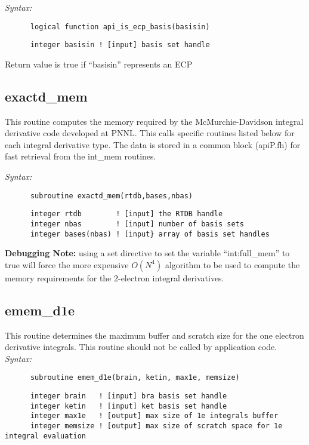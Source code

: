 {\it Syntax:} 
\begin{verbatim} 
      logical function api_is_ecp_basis(basisin) 
\end{verbatim} 
\begin{verbatim} 
      integer basisin ! [input] basis set handle 
\end{verbatim} 
Return value is true if ``basisin'' represents an ECP 
 
\subsection{exactd\_mem} 
This routine computes the memory required by the  
McMurchie-Davidson integral derivative code developed at PNNL. 
This calls specific routines listed below for each integral 
derivative type.  The data is stored in a common block (apiP.fh) 
for fast retrieval from the int\_mem routines. 
 
{\it Syntax:} 
\begin{verbatim} 
      subroutine exactd_mem(rtdb,bases,nbas) 
\end{verbatim} 
\begin{verbatim} 
      integer rtdb        ! [input] the RTDB handle 
      integer nbas        ! [input] number of basis sets 
      integer bases(nbas) ! [input} array of basis set handles 
\end{verbatim} 
 
{\bf Debugging Note:} using a set directive to set the  
variable ``int:full\_mem'' to true will force the more  
expensive $O(N^4)$ algorithm to be used to compute the  
memory requirements for the 2-electron integral derivatives. 
 
\subsection{emem\_d1e} 
This routine determines the maximum buffer and scratch size for the  
one electron derivative integrals. 
This routine should not be called by application code. 
{\it Syntax:} 
\begin{verbatim} 
      subroutine emem_d1e(brain, ketin, max1e, memsize) 
\end{verbatim} 
\begin{verbatim} 
      integer brain   ! [input] bra basis set handle 
      integer ketin   ! [input] ket basis set handle 
      integer max1e   ! [output] max size of 1e integrals buffer 
      integer memsize ! [output] max size of scratch space for 1e integral evaluation 
\end{verbatim} 
